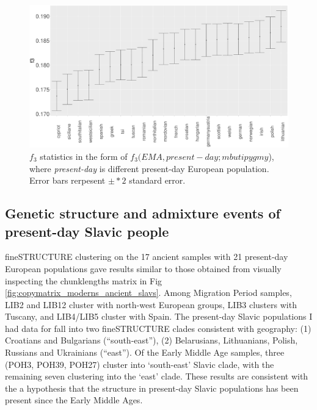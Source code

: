 \begin{figure}[htp]
    \centering
    \includegraphics[width=1.0\textwidth]{../images/chapter5/f3_HB_ancient_slavs.pdf}
    \caption{$f_{3}$ statistics in the form of $f_{3}(EMA, present-day;mbuti pygmy$), where \textit{present-day} is different present-day European population. Error bars rerpesent $\pm*2$ standard error.}
    \label{fig:f3_HB_ancient_slavs}
\end{figure}


\subsection{Genetic structure and admixture events of present-day Slavic people}

fineSTRUCTURE clustering on the 17 ancient samples with 21 present-day European populations gave results similar to those obtained from visually inspecting the chunklengths matrix in Fig \ref{fig:copymatrix_moderns_ancient_slavs}. Among Migration Period samples, LIB2 and LIB12 cluster with north-west European groups, LIB3 clusters with Tuscany, and LIB4/LIB5 cluster with Spain. The present-day Slavic populations I had data for fall into two fineSTRUCTURE clades consistent with geography: (1) Croatians and Bulgarians (``south-east''), (2) Belarusians, Lithuanians, Polish, Russians and Ukrainians (``east''). Of the Early Middle Age samples, three (POH3, POH39, POH27) cluster into `south-east' Slavic clade, with the remaining seven clustering into the `east' clade. These results are consistent with the a hypothesis that the structure in present-day Slavic populations has been present since the Early Middle Ages.


